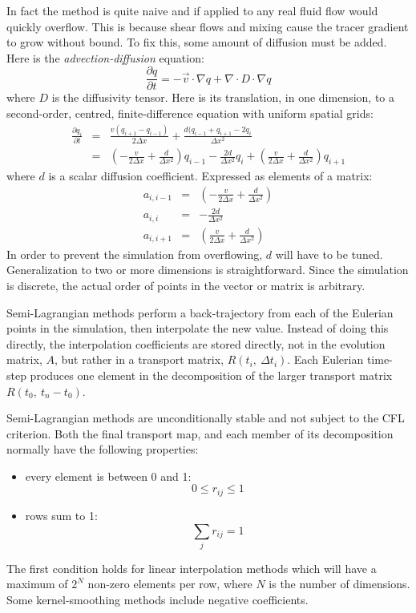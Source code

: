 \documentclass[11pt]{article}
\begin{document}
In fact the method is quite naive and if applied to any real fluid flow would 
quickly overflow.
This is because shear flows and mixing cause the tracer gradient to grow without bound.
To fix this, some amount of diffusion must be added.  Here is the 
{\it advection-diffusion} equation:
\begin{equation}
\frac{\partial q}{\partial t} = - \vec v \cdot \nabla q + \nabla \cdot D \cdot \nabla q
\end{equation}
where $D$ is the diffusivity tensor.
Here is its translation, in one dimension, to a second-order, centred,
finite-difference equation with uniform spatial grids:
\begin{eqnarray}
\frac{\partial q_i}{\partial t} & = & \frac{v(q_{i+1} - q_{i-1})}{2 \Delta x} +
	\frac{d (q_{i-1} + q_{i+1} - 2 q_i}{\Delta x^2} \\
& = & \left (- \frac{v}{2 \Delta x} + \frac{d}{\Delta x^2} \right ) q_{i-1} -
	\frac{2 d}{\Delta x^2} q_i + 
	\left (\frac{v}{2 \Delta x} + \frac{d}{\Delta x^2} \right ) q_{i+1}
\end{eqnarray}
where $d$ is a scalar diffusion coefficient.
Expressed as elements of a matrix:
\begin{eqnarray}
a_{i,i-1} & = & \left (- \frac{v}{2 \Delta x} + \frac{d}{\Delta x^2} \right ) \\
a_{i,i} & = & -\frac{2 d}{\Delta x^2} \\
a_{i,i+1} & = & \left (\frac{v}{2 \Delta x} + \frac{d}{\Delta x^2} \right )
\end{eqnarray}
In order to prevent the simulation from overflowing, $d$ will have to be tuned.
Generalization to two or more dimensions is straightforward.
Since the simulation is discrete, the actual order of points in the
vector or matrix is arbitrary.

Semi-Lagrangian methods perform a back-trajectory from each of the Eulerian
points in the simulation, then interpolate the new value.  Instead of doing
this directly, the interpolation coefficients are stored directly, not in
the evolution matrix, $A$, but rather in a transport matrix, $R(t_i,~\Delta t_i)$.
Each Eulerian time-step produces one element in the decomposition of the
larger transport matrix $R(t_0,~t_n-t_0)$.

Semi-Lagrangian methods are unconditionally stable and not subject to the
CFL criterion.
Both the final transport map, and each member of its decomposition normally have
the following properties:
\begin{itemize}
\item every element is between 0 and 1:
\begin{equation}
0 \le r_{ij} \le 1
\label{element_on_unit_interval}
\end{equation}
\item rows sum to 1:
\begin{equation}
\sum_j r_{ij} = 1
\end{equation}
\end{itemize}
The first condition holds for linear interpolation methods which will have
a maximum of $2^N$ non-zero elements per row, 
where $N$ is the number of dimensions. 
Some kernel-smoothing methods include negative coefficients.
\end{document}
